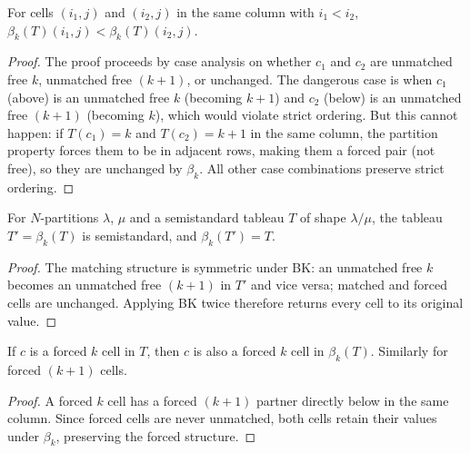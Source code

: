 \begin{lemma}
\label{lem.sf.bk-column-strict}
\leanhelper
\leanok
For cells $(i_1, j)$ and $(i_2, j)$ in the same column with $i_1 < i_2$,
$\beta_k(T)(i_1, j) < \beta_k(T)(i_2, j)$.
\end{lemma}

\begin{proof}
\leanok
The proof proceeds by case analysis on whether $c_1$ and $c_2$ are
unmatched free $k$, unmatched free $(k{+}1)$, or unchanged.
The dangerous case is when $c_1$ (above) is an unmatched free $k$
(becoming $k{+}1$) and $c_2$ (below) is an unmatched free $(k{+}1)$
(becoming $k$), which would violate strict ordering. But this cannot happen:
if $T(c_1) = k$ and $T(c_2) = k{+}1$ in the same column, the partition
property forces them to be in adjacent rows, making them a forced pair
(not free), so they are unchanged by $\beta_k$.
All other case combinations preserve strict ordering.
\end{proof}

\begin{lemma}
\label{lem.sf.bk-involutive}
\leanhelper
\leanok
For $N$-partitions $\lambda$, $\mu$ and a semistandard tableau $T$ of shape
$\lambda/\mu$, the tableau $T' = \beta_k(T)$ is semistandard, and $\beta_k(T') = T$.
\end{lemma}

\begin{proof}
\leanok
The matching structure is symmetric under BK: an unmatched free $k$ becomes
an unmatched free $(k{+}1)$ in $T'$ and vice versa; matched and forced cells
are unchanged. Applying BK twice therefore returns every cell to its original value.
\end{proof}

\begin{lemma}
\label{lem.sf.bk-forced-preserved}
\leanhelper
\leanok
If $c$ is a forced $k$ cell in $T$, then $c$ is also a forced $k$ cell in
$\beta_k(T)$. Similarly for forced $(k{+}1)$ cells.
\end{lemma}

\begin{proof}
\leanok
A forced $k$ cell has a forced $(k{+}1)$ partner directly below in the same
column. Since forced cells are never unmatched, both cells retain their values
under $\beta_k$, preserving the forced structure.
\end{proof}

